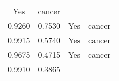 \documentclass[12pt,]{article}
\begin{document}
\begin{longtable}[]{@{}cccc@{}}
\begin{minipage}[t]{0.22\columnwidth}
Yes\strut
\end{minipage} & \begin{minipage}[t]{0.16\columnwidth}\centering\strut
cancer\strut
\end{minipage}\tabularnewline
\begin{minipage}[t]{0.24\columnwidth}\centering\strut
0.9260\strut
\end{minipage} & \begin{minipage}[t]{0.26\columnwidth}\centering\strut
0.7530\strut
\end{minipage} & \begin{minipage}[t]{0.22\columnwidth}\centering\strut
Yes\strut
\end{minipage} & \begin{minipage}[t]{0.16\columnwidth}\centering\strut
cancer\strut
\end{minipage}\tabularnewline
\begin{minipage}[t]{0.24\columnwidth}\centering\strut
0.9915\strut
\end{minipage} & \begin{minipage}[t]{0.26\columnwidth}\centering\strut
0.5740\strut
\end{minipage} & \begin{minipage}[t]{0.22\columnwidth}\centering\strut
Yes\strut
\end{minipage} & \begin{minipage}[t]{0.16\columnwidth}\centering\strut
cancer\strut
\end{minipage}\tabularnewline
\begin{minipage}[t]{0.24\columnwidth}\centering\strut
0.9675\strut
\end{minipage} & \begin{minipage}[t]{0.26\columnwidth}\centering\strut
0.4715\strut
\end{minipage} & \begin{minipage}[t]{0.22\columnwidth}\centering\strut
Yes\strut
\end{minipage} & \begin{minipage}[t]{0.16\columnwidth}\centering\strut
cancer\strut
\end{minipage}\tabularnewline
\begin{minipage}[t]{0.24\columnwidth}\centering\strut
0.9910\strut
\end{minipage} & \begin{minipage}[t]{0.26\columnwidth}\centering\strut
0.3865\strut
\end{minipage} & \begin{minipage}[t]{0.22\columnwidth}\centering\strut

\end{minipage}
\end{longtable}
\end{document}
